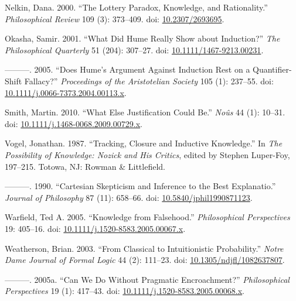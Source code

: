 \documentclass[
  10pt,
  letterpaper,
  DIV=11,
  numbers=noendperiod,
  twoside]{scrartcl}
\newlength{\cslhangindent}
\newenvironment{CSLReferences}[2] %
 {\begin{list}{}{%
  \setlength{\itemindent}{0pt}
  \setlength{\leftmargin}{0pt}
  \setlength{\parsep}{0pt}
  \ifodd #1
   \setlength{\leftmargin}{\cslhangindent}
   \setlength{\itemindent}{-1\cslhangindent}
  \fi
  \setlength{\itemsep}{#2\baselineskip}}}
 {\end{list}}
\begin{document}
\begin{CSLReferences}{1}{0}
Nelkin, Dana. 2000. {``The Lottery Paradox, Knowledge, and
Rationality.''} \emph{Philosophical Review} 109 (3): 373--409. doi:
\href{https://doi.org/10.2307/2693695}{10.2307/2693695}.

Okasha, Samir. 2001. {``What Did Hume Really Show about Induction?''}
\emph{The Philosophical Quarterly} 51 (204): 307--27. doi:
\href{https://doi.org/10.1111/1467-9213.00231}{10.1111/1467-9213.00231}.

---------. 2005. {``Does Hume's Argument Against Induction Rest on a
Quantifier-Shift Fallacy?''} \emph{Proceedings of the Aristotelian
Society} 105 (1): 237--55. doi:
\href{https://doi.org/10.1111/j.0066-7373.2004.00113.x}{10.1111/j.0066-7373.2004.00113.x}.

Smith, Martin. 2010. {``What Else Justification Could Be.''}
\emph{No{û}s} 44 (1): 10--31. doi:
\href{https://doi.org/10.1111/j.1468-0068.2009.00729.x}{10.1111/j.1468-0068.2009.00729.x}.

Vogel, Jonathan. 1987. {``Tracking, Closure and Inductive Knowledge.''}
In \emph{The Possibility of Knowledge: Nozick and His Critics}, edited
by Stephen Luper-Foy, 197--215. Totowa, NJ: Rowman \& Littlefield.

---------. 1990. {``Cartesian Skepticism and Inference to the Best
Explanatio.''} \emph{Journal of Philosophy} 87 (11): 658--66. doi:
\href{https://doi.org/10.5840/jphil1990871123}{10.5840/jphil1990871123}.

Warfield, Ted A. 2005. {``Knowledge from Falsehood.''}
\emph{Philosophical Perspectives} 19: 405--16. doi:
\href{https://doi.org/10.1111/j.1520-8583.2005.00067.x}{10.1111/j.1520-8583.2005.00067.x}.

Weatherson, Brian. 2003. {``From Classical to Intuitionistic
Probability.''} \emph{Notre Dame Journal of Formal Logic} 44 (2):
111--23. doi:
\href{https://doi.org/10.1305/ndjfl/1082637807}{10.1305/ndjfl/1082637807}.

---------. 2005a. {``{Can We Do Without Pragmatic Encroachment?}''}
\emph{Philosophical Perspectives} 19 (1): 417--43. doi:
\href{https://doi.org/10.1111/j.1520-8583.2005.00068.x}{10.1111/j.1520-8583.2005.00068.x}.


\end{CSLReferences}
\end{document}
